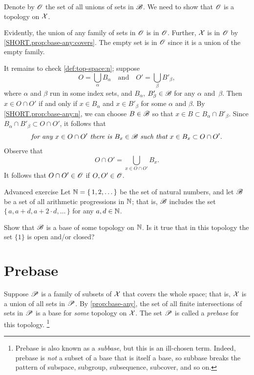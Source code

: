 Denote by $\mathscr{O}$ the set of all unions of sets in $\mathscr{B}$.
We need to show that $\mathscr{O}$ is a topology on $\mathcal{X}$.

Evidently, the union of any family of sets in $\mathscr{O}$ is in $\mathscr{O}$.
Further, $\mathcal{X}$ is in $\mathscr{O}$ by \ref{SHORT.prop:base-any:covers}.
The empty set is in $\mathscr{O}$ since it is a union of the empty family.

It remains to check \ref{def:top-space:n}; suppose
\[O=\bigcup_\alpha B_\alpha
\quad\text{and}\quad
O'=\bigcup_\beta B'_\beta,
\]
where $\alpha$ and $\beta$ run in some index sets, and $B_\alpha$, $B'_\beta\in \mathscr{B}$ for any $\alpha$ and~$\beta$.
Then $x\in O\cap O'$ if and only if $x\in B_\alpha$ and $x\in B'_\beta$ for some $\alpha$ and $\beta$.
By \ref{SHORT.prop:base-any:n}, we can choose $B\in \mathscr{B}$ so that $x\in B\subset B_\alpha \cap B'_\beta$.
Since $B_\alpha \cap B'_\beta\subset O\cap O'$, it follows that 
\[\textit{for any $x\in O\cap O'$ there is $B_x\in\mathscr{B}$ such that 
$x\in B_x\subset O\cap O'$.}\]
Observe that 
\[O\cap O'=\bigcup_{x\in O\cap O'} B_x.\]
It follows that $O\cap O'\in\mathscr{O}$ if $O,O'\in\mathscr{O}$.
\qeds

\begin{thm}{Advanced exercise}\label{ex:base-N}
Let $\mathbb{N}=\{\,1,2,\ldots\,\}$ be the set of natural numbers,
and let $\mathscr{B}$ be a set of all arithmetic progressions in $\mathbb{N}$;
that is, $\mathscr{B}$ includes the set $\{\,a,a+d,a+2\cdot d,\ldots\,\}$ for any $a, d\in \mathbb{N}$.

Show that $\mathscr{B}$ is a base of some topology on $\mathbb{N}$.
Is it true that in this topology the set $\{1\}$ is open and/or closed?

\end{thm}


\section{Prebase}\label{prebase}

Suppose $\mathscr{P}$ is a family of subsets of $\mathcal{X}$ that covers the whole space;
that is, $\mathcal{X}$ is a union of all sets in $\mathscr{P}$.
By \ref{prop:base-any}, the set of all finite intersections of sets in $\mathscr{P}$ is a base for \textit{some} topology on $\mathcal{X}$.
The set $\mathscr{P}$ is called a \emph{prebase} for this topology.%
\footnote{Prebase is also known as a \emph{subbase}, but this is an ill-chosen term.
Indeed, prebase is \textit{not}
a subset of a base that is itself a base, so subbase breaks the pattern of subspace, subgroup, subsequence, subcover, and so on.}

